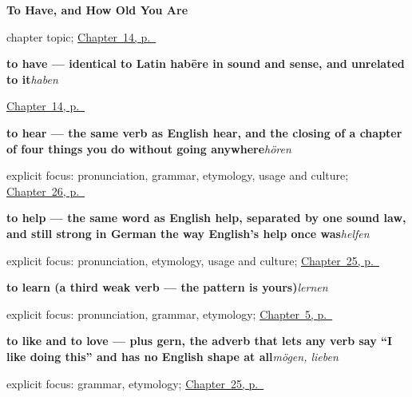 \noindent\begin{minipage}[t]{\linewidth}
\raggedright
\textbf{To Have, and How Old You Are}\par
\footnotesize chapter topic; \hyperref[ch:haben-alter]{Chapter~14, p.~\pageref*{ch:haben-alter}}
\end{minipage}\par\smallskip

\noindent\begin{minipage}[t]{\linewidth}
\raggedright
\textbf{to have — identical to Latin habēre in sound and sense, and unrelated to it}\enspace\emph{haben}\par
\footnotesize \hyperref[ch:haben-alter]{Chapter~14, p.~\pageref*{ch:haben-alter}}
\end{minipage}\par\smallskip

\noindent\begin{minipage}[t]{\linewidth}
\raggedright
\textbf{to hear — the same verb as English hear, and the closing of a chapter of four things you do without going anywhere}\enspace\emph{hören}\par
\footnotesize explicit focus: pronunciation, grammar, etymology, usage and culture; \hyperref[ch:ge-still-verbs]{Chapter~26, p.~\pageref*{ch:ge-still-verbs}}
\end{minipage}\par\smallskip

\noindent\begin{minipage}[t]{\linewidth}
\raggedright
\textbf{to help — the same word as English help, separated by one sound law, and still strong in German the way English's help once was}\enspace\emph{helfen}\par
\footnotesize explicit focus: pronunciation, etymology, usage and culture; \hyperref[ch:ge-doing-verbs]{Chapter~25, p.~\pageref*{ch:ge-doing-verbs}}
\end{minipage}\par\smallskip

\noindent\begin{minipage}[t]{\linewidth}
\raggedright
\textbf{to learn (a third weak verb — the pattern is yours)}\enspace\emph{lernen}\par
\footnotesize explicit focus: pronunciation, grammar, etymology; \hyperref[ch:first-verbs]{Chapter~5, p.~\pageref*{ch:first-verbs}}
\end{minipage}\par\smallskip

\noindent\begin{minipage}[t]{\linewidth}
\raggedright
\textbf{to like and to love — plus gern, the adverb that lets any verb say \textquotedblleft{}I like doing this\textquotedblright{} and has no English shape at all}\enspace\emph{mögen, lieben}\par
\footnotesize explicit focus: grammar, etymology; \hyperref[ch:ge-doing-verbs]{Chapter~25, p.~\pageref*{ch:ge-doing-verbs}}
\end{minipage}\par\smallskip


